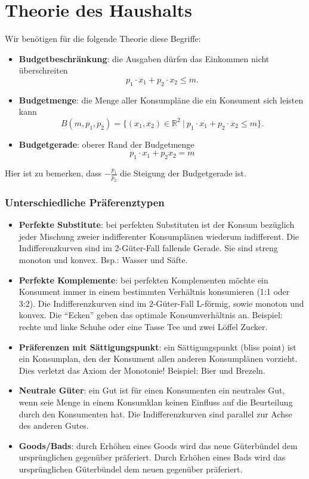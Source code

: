 \section{Theorie des Haushalts}

 Wir benötigen für die folgende Theorie diese Begriffe:

\begin{itemize}
	\item \textbf{Budgetbeschränkung}: die Ausgaben dürfen das Einkommen nicht überschreiten 
		$$ p_1 \cdot x_1 + p_2 \cdot x_2 \leq m. $$
	\item \textbf{Budgetmenge}: die Menge aller Konsumpläne die ein Konsument sich leisten kann 
		$$ B(m, p_1, p_2) = \big\{ (x_1, x_2) \in \mathbb{R}^2 ~|~p_1 \cdot x_1 + p_2 \cdot x_2 \leq m \big\}. $$
	\item \textbf{Budgetgerade}: oberer Rand der Budgetmenge
		$$ p_1 \cdot x_1 + p_2 x_2 = m $$ 
\end{itemize}


Hier ist zu bemerken, dass $- \frac{p_1}{p_2}$ die Steigung der Budgetgerade ist. ~\bigskip

\subsubsection*{Unterschiedliche Präferenztypen}

\begin{itemize}
	\item \textbf{Perfekte Substitute}: bei perfekten Substituten ist der Konsum bezüglich jeder Mischung zweier indifferenter Konsumplänen wiederum indifferent. Die Indifferenzkurven sind im 2-Güter-Fall fallende Gerade. Sie sind streng monoton und konvex. Bsp.: Wasser und Säfte.
	\item \textbf{Perfekte Komplemente}: bei perfekten Komplementen möchte ein Konsument immer in einem bestimmten Verhältnis konsumieren (1:1 oder 3:2). Die Indifferenzkurven sind im 2-Güter-Fall L-förmig, sowie monoton und konvex. Die \enquote{Ecken} geben das optimale Konsumverhältnis an. Beispiel: rechte und linke Schuhe oder eine Tasse Tee und zwei Löffel Zucker.
	\item \textbf{Präferenzen mit Sättigungspunkt}: ein Sättigungspunkt (bliss point) ist ein Konsumplan, den der Konsument allen anderen Konsumplänen vorzieht. Dies verletzt das Axiom der Monotonie! Beispiel: Bier und Brezeln.
	\item \textbf{Neutrale Güter}: ein Gut ist für einen Konsumenten ein neutrales Gut, wenn seie Menge in einem Konsumklan keinen Einfluss auf die Beurteilung durch den Konsumenten hat. Die Indifferenzkurven sind parallel zur Achse des anderen Gutes.
	\item \textbf{Goods/Bads}: durch Erhöhen eines Goods wird das neue Güterbündel dem ursprünglichen gegenüber präferiert. Durch Erhöhen eines Bads wird das ursprünglichen Güterbündel dem neuen gegenüber präferiert. 
\end{itemize}


